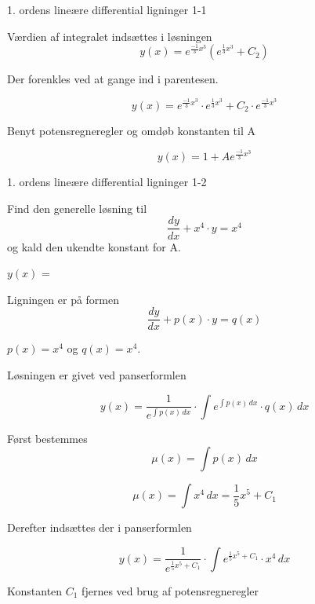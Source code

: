 \documentclass{article}
\begin{document}
\begin{exercise}{1. ordens lineære differential ligninger 1-1}
\hint

Værdien af integralet indsættes i løsningen
\[
y(x) = e^{\frac{-1}{3}x^3} \left( e^{\frac{1}{3}x^3}+ C_2\right)
\]

\hint

Der forenkles ved at gange ind i parentesen.

\hint
\[
y(x) = e^{\frac{-1}{3}x^3} \cdot e^{\frac{1}{3}x^3} + C_2 \cdot e^{\frac{-1}{3}x^3} 
\]

\hint

Benyt potensregneregler og omdøb konstanten til A

\hint
\[
y(x) = 1 + A e^{\frac{-1}{3}x^3}
\]


\end{exercise}

\newpage

\begin{exercise}{1. ordens lineære differential ligninger 1-2}
	
	
	Find den generelle løsning til
	\[
	\frac{dy}{dx} + x^4 \cdot y = x^4
	\]
	og kald den ukendte konstant for A.
	
	$y(x)$ =  \\
	
	
	
	\hint
	
	Ligningen er på formen
	\[
	\frac{dy}{dx} + p(x) \cdot y = q(x)
	\]
	
	\hint
	
	$p(x)=x^4$ og $q(x)=x^4$.
	
	\hint
	
	Løsningen er givet ved panserformlen
	
	
	\hint
	
	\[
	y(x) = \frac{1}{e^{\int p(x) \, dx}} \cdot \int e^{\int p(x) \, dx}  \cdot q(x) \, dx
	\]
	
	\hint
	
	Først bestemmes 
	\[
	\mu(x) = \int p(x) \, dx
	\]
	
	\hint
	\[
	\mu(x) = \int x^4 \, dx = \frac{1}{5} x^5 + C_1
	\]
	
	\hint
	Derefter indsættes der i  panserformlen
	
	\hint
	
	\[
	y(x) = \frac{1}{e^{\frac{1}{5}x^5 + C_1}} \cdot \int e^{\frac{1}{5}x^5 + C_1}  \cdot x^4 \, dx
	\]
	
	
	\hint
	
	Konstanten $C_1$ fjernes ved brug af potensregneregler
	

\end{exercise}
\end{document}
